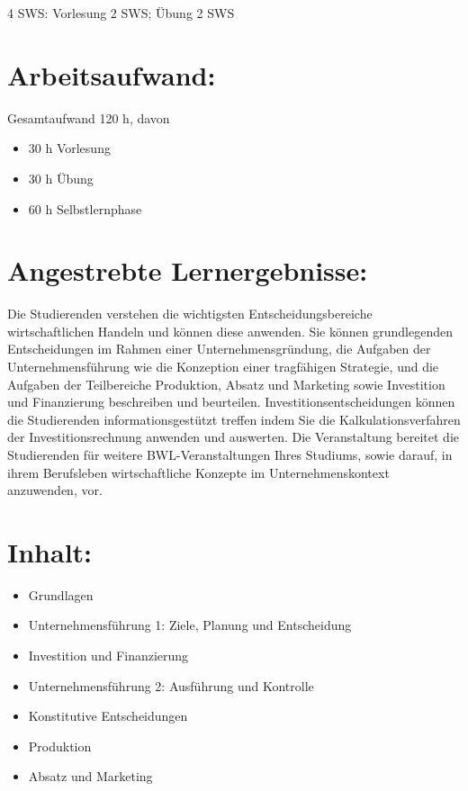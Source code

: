 4 SWS: Vorlesung 2 SWS; Übung 2 SWS

\section*{Arbeitsaufwand:}\label{arbeitsaufwand-6}

Gesamtaufwand 120 h, davon

\begin{itemize}
\tightlist
\item
  30 h Vorlesung
\item
  30 h Übung
\item
  60 h Selbstlernphase
\end{itemize}

\section*{Angestrebte
Lernergebnisse:}\label{angestrebte-lernergebnisse-6}

Die Studierenden verstehen die wichtigsten Entscheidungsbereiche
wirtschaftlichen Handeln und können diese anwenden. Sie können
grundlegenden Entscheidungen im Rahmen einer Unternehmensgründung, die
Aufgaben der Unternehmensführung wie die Konzeption einer tragfähigen
Strategie, und die Aufgaben der Teilbereiche Produktion, Absatz und
Marketing sowie Investition und Finanzierung beschreiben und beurteilen.
Investitionsentscheidungen können die Studierenden informationsgestützt
treffen indem Sie die Kalkulationsverfahren der Investitionsrechnung
anwenden und auswerten. Die Veranstaltung bereitet die Studierenden für
weitere BWL-Veranstaltungen Ihres Studiums, sowie darauf, in ihrem
Berufsleben wirtschaftliche Konzepte im Unternehmenskontext anzuwenden,
vor.

\section*{Inhalt:}\label{inhalt-6}

\begin{itemize}
\tightlist
\item
  Grundlagen
\item
  Unternehmensführung 1: Ziele, Planung und Entscheidung
\item
  Investition und Finanzierung
\item
  Unternehmensführung 2: Ausführung und Kontrolle
\item
  Konstitutive Entscheidungen
\item
  Produktion
\item
  Absatz und Marketing
\end{itemize}

